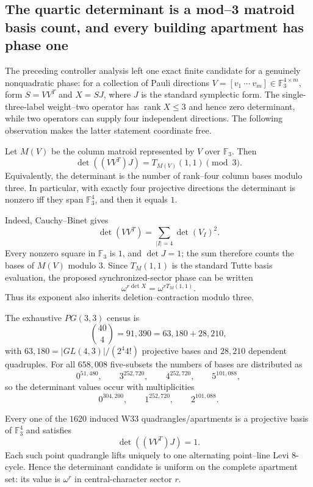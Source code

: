 \subsection{The quartic determinant is a mod--3 matroid basis count, and every building apartment has phase one}
\label{sec:20260917-det-matroid-apartment}

The preceding controller analysis left one exact finite candidate for a genuinely
nonquadratic phase: for a collection of Pauli directions
$V=[v_1\ \cdots\ v_m]\in\mathbb F_3^{4\times m}$, form
$S=VV^T$ and $X=SJ$, where $J$ is the standard symplectic form.  The
single-three-label weight--two operator has $\operatorname{rank}X\le3$ and hence
zero determinant, while two operators can supply four independent directions.
The following observation makes the latter statement coordinate free.

\begin{theorem}
Let $M(V)$ be the column matroid represented by $V$ over $\mathbb F_3$.
Then
\[
 \boxed{\det((VV^T)J)=T_{M(V)}(1,1)\pmod3.}
\]
Equivalently, the determinant is the number of rank--four column bases modulo
three.  In particular, with exactly four projective directions the determinant
is nonzero iff they span $\mathbb F_3^4$, and then it equals $1$.
\end{theorem}

\noindent
Indeed, Cauchy--Binet gives
\[
 \det(VV^T)=\sum_{|I|=4}\det(V_I)^2.
\]
Every nonzero square in $\mathbb F_3$ is $1$, and $\det J=1$; the sum therefore
counts the bases of $M(V)$ modulo $3$.  Since $T_M(1,1)$ is the standard Tutte
basis evaluation, the proposed synchronized-sector phase can be written
\[
 \omega^{r\det X}=\omega^{rT_M(1,1)}.
\]
Thus its exponent also inherits deletion--contraction modulo three.

The exhaustive $PG(3,3)$ census is
\[
 \binom{40}{4}=91{,}390=63{,}180+28{,}210,
\]
with $63{,}180=|GL(4,3)|/(2^4 4!)$ projective bases and $28{,}210$
dependent quadruples.  For all $658{,}008$ five-subsets the numbers of bases
are distributed as
\[
 0^{51{,}480},\qquad
 3^{252{,}720},\qquad
 4^{252{,}720},\qquad
 5^{101{,}088},
\]
so the determinant values occur with multiplicities
\[
 \boxed{0^{304{,}200},\qquad1^{252{,}720},\qquad2^{101{,}088}.}
\]

\begin{theorem}
Every one of the $1620$ induced W33 quadrangles/apartments is a projective basis
of $\mathbb F_3^4$ and satisfies
\[
 \boxed{\det((VV^T)J)=1.}
\]
Each such point quadrangle lifts uniquely to one alternating point--line Levi
$8$-cycle.  Hence the determinant candidate is uniform on the complete
apartment set: its value is $\omega^r$ in central-character sector $r$.
\end{theorem}

